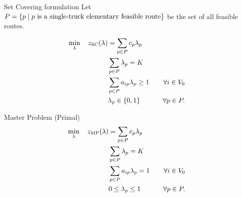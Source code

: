 \begin{frame}{Set Covering formulation}
	Let $P = \Set*{p \mid p\ \text{is a single-truck elementary feasible route}}$ be the set of all feasible routes.

	\begin{align}
		\min_{\lambda} \quad z_\mt{SC}(\lambda) & = \sum_{p \in P}  c_p \lambda_p              & \label{eq:set-covering-obj-func}                                                       \\
		                                        & \sum_{p \in P} \lambda_{p} = K               & \label{eq:set-covering-K-routes}                                                       \\
		                                        & \sum_{p \in P}  a_{ip} \lambda_p \ge 1       & \quad \forall i \in V_0 \label{eq:set-covering-customers-visited-by-exactly-one-route} \\
		                                        & \lambda_p                    \in \Set*{0, 1} & \quad \forall p \in P \label{eq:set-covering-lambda-mip-var-bounds}.
	\end{align}
\end{frame}

\begin{frame}{Master Problem (Primal)}
	\begin{align}
		\min_{\lambda} \quad z_\mt{MP}(\lambda) & = \sum_{p \in P}  c_p \lambda_p      & \label{eq:mp-obj-func}                                                                                                    \\
		                                        & \sum_{p \in P} \lambda_{p} = K       & \label{eq:mp-K-routes}                                                                                                    \\
		                                        & \sum_{p \in P}  a_{ip} \lambda_p = 1 & \quad \forall i \in V_0                                              \label{eq:mp-customers-visited-by-exactly-one-route} \\
		                                        & 0 \le \lambda_p \le 1                & \quad \forall p \in P \label{eq:mp-lambda-mip-var-bounds}.
	\end{align}
\end{frame}


